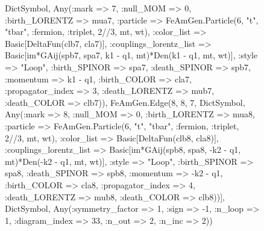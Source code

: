 \documentclass{revtex4}
\begin{document}
\begin{figure}[!htb]
\begin{center}
{Dict{Symbol, Any}(:mark => 7, :null_MOM => 0, :birth_LORENTZ => mua7, :particle => FeAmGen.Particle(6, "t", "tbar", :fermion, :triplet, 2//3, mt, wt), :color_list => Basic[DeltaFun(clb7, cla7)], :couplings_lorentz_list => Basic[im*GAij(spb7, spa7, k1 - q1, mt)*Den(k1 - q1, mt, wt)], :style => "Loop", :birth_SPINOR => spa7, :death_SPINOR => spb7, :momentum => k1 - q1, :birth_COLOR => cla7, :propagator_index => 3, :death_LORENTZ => mub7, :death_COLOR => clb7)), FeAmGen.Edge(8, 8, 7, Dict{Symbol, Any}(:mark => 8, :null_MOM => 0, :birth_LORENTZ => mua8, :particle => FeAmGen.Particle(6, "t", "tbar", :fermion, :triplet, 2//3, mt, wt), :color_list => Basic[DeltaFun(clb8, cla8)], :couplings_lorentz_list => Basic[im*GAij(spb8, spa8, -k2 - q1, mt)*Den(-k2 - q1, mt, wt)], :style => "Loop", :birth_SPINOR => spa8, :death_SPINOR => spb8, :momentum => -k2 - q1, :birth_COLOR => cla8, :propagator_index => 4, :death_LORENTZ => mub8, :death_COLOR => clb8))], Dict{Symbol, Any}(:symmetry_factor => 1, :sign => -1, :n_loop => 1, :diagram_index => 33, :n_out => 2, :n_inc => 2)) 
}
\end{center}
\end{figure}
\end{document}
